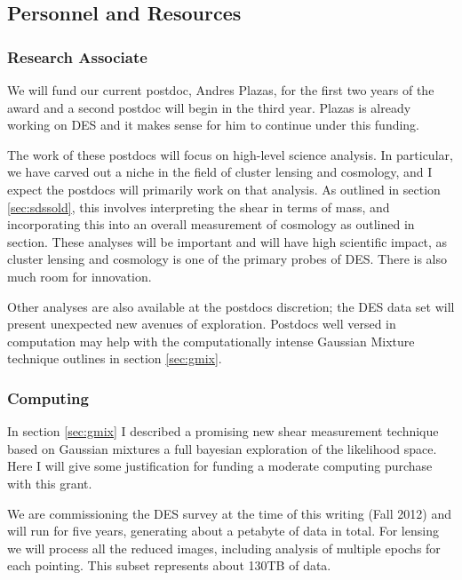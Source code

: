 \documentclass[12pt]{article}
\newcommand{\commissdate}{Fall 2012}
\begin{document}
\subsection{Personnel and Resources} \label{sec:resources}

\subsubsection{Research Associate}

We will fund our current postdoc, Andres Plazas, for the first two years of the
award and a second postdoc will begin in the third year.  Plazas is already
working on DES and it makes sense for him to continue under this funding.

The work of these postdocs will focus on high-level science analysis.  In
particular, we have carved out a niche in the field of cluster lensing and
cosmology, and I expect the postdocs will primarily work on that analysis.  As
outlined in section \ref{sec:sdssold}, this involves interpreting the shear in
terms of mass, and incorporating this into an overall measurement of cosmology
as outlined in section.  These analyses will be important and will have high
scientific impact, as cluster lensing and cosmology is one of the primary
probes of DES.  There is also much room for innovation.

Other analyses are also available at the postdocs discretion; the DES data set
will present unexpected new avenues of exploration.  Postdocs well versed in
computation may help with the computationally intense Gaussian Mixture
technique outlines in section \ref{sec:gmix}.

\subsubsection{Computing} \label{sec:computing}

In section \ref{sec:gmix} I described a promising new shear measurement
technique based on Gaussian mixtures a full bayesian exploration of the
likelihood space.  Here I will give some justification for funding a moderate
computing purchase with this grant.

We are commissioning the DES survey at the time of this writing (\commissdate)
and will run for five years, generating about a petabyte of data in total.  For
lensing we will process all the reduced images, including analysis of multiple
epochs for each pointing.  This subset represents about 130TB of data.
\end{document}
